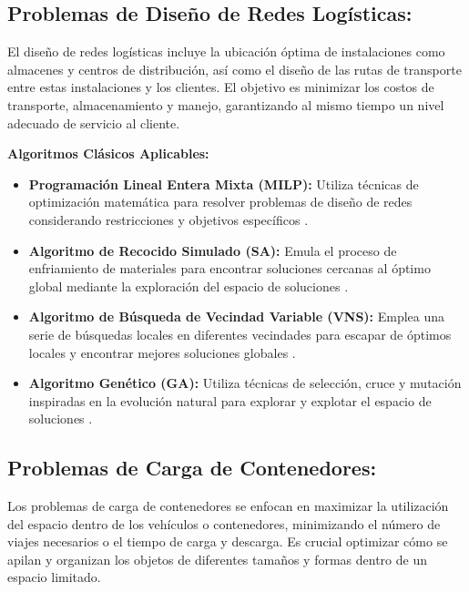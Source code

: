 \documentclass[11pt,a4paper,spanish]{book}
\begin{document}
\subsection{Problemas de Diseño de Redes Logísticas:} 
	
	El diseño de redes logísticas incluye la ubicación óptima de instalaciones como almacenes y centros de distribución, así como el diseño de las rutas de transporte entre estas instalaciones y los clientes. El objetivo es minimizar los costos de transporte, almacenamiento y manejo, garantizando al mismo tiempo un nivel adecuado de servicio al cliente.
	
	\textbf{Algoritmos Clásicos Aplicables:}
	\begin{itemize}
		\item \textbf{Programación Lineal Entera Mixta (MILP):} Utiliza técnicas de optimización matemática para resolver problemas de diseño de redes considerando restricciones y objetivos específicos \cite{nemhauser1999integer}.
		\item \textbf{Algoritmo de Recocido Simulado (SA):} Emula el proceso de enfriamiento de materiales para encontrar soluciones cercanas al óptimo global mediante la exploración del espacio de soluciones \cite{kirkpatrick1983optimization}.
		\item \textbf{Algoritmo de Búsqueda de Vecindad Variable (VNS):} Emplea una serie de búsquedas locales en diferentes vecindades para escapar de óptimos locales y encontrar mejores soluciones globales \cite{mladenovic1997variable}.
		\item \textbf{Algoritmo Genético (GA):} Utiliza técnicas de selección, cruce y mutación inspiradas en la evolución natural para explorar y explotar el espacio de soluciones \cite{holland1992adaptation}.
	\end{itemize}
	
\subsection{Problemas de Carga de Contenedores:} 
	
	Los problemas de carga de contenedores se enfocan en maximizar la utilización del espacio dentro de los vehículos o contenedores, minimizando el número de viajes necesarios o el tiempo de carga y descarga. Es crucial optimizar cómo se apilan y organizan los objetos de diferentes tamaños y formas dentro de un espacio limitado.
	
\end{document}
